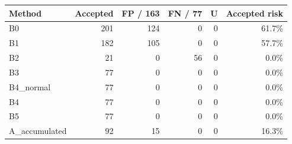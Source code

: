 \begin{tabular}{lrrrrr}\toprule
Method & Accepted & FP / 163 & FN / 77 & U & Accepted risk\\\midrule
B0 & 201 & 124 & 0 & 0 & 61.7\%\\
B1 & 182 & 105 & 0 & 0 & 57.7\%\\
B2 & 21 & 0 & 56 & 0 & 0.0\%\\
B3 & 77 & 0 & 0 & 0 & 0.0\%\\
B4\_normal & 77 & 0 & 0 & 0 & 0.0\%\\
B4 & 77 & 0 & 0 & 0 & 0.0\%\\
B5 & 77 & 0 & 0 & 0 & 0.0\%\\
A\_accumulated & 92 & 15 & 0 & 0 & 16.3\%\\
\bottomrule\end{tabular}
